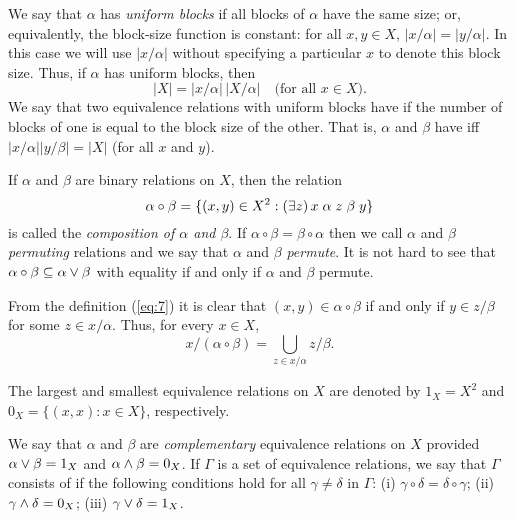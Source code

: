 We say that $\alpha$ has \emph{uniform blocks} if all blocks of  $\alpha$ have
the same size; or, equivalently, the block-size function is constant: for all 
$x, y \in X$, $|x/\alpha| = |y/\alpha|$.  
In this case we will use $|x/\alpha|$ without specifying
a particular $x$ to denote this block size.
Thus, if $\alpha$
has uniform blocks, then
\[
|X|= |x/\alpha| \,|X/\alpha| %
\quad \text{(for all $x\in X$).}
\]
We say that two equivalence relations with uniform
blocks  have 
 if the number of blocks of one is equal to
the block size of the other. That is,
$\alpha$ and $\beta$ 
have \cubs
iff $|x/\alpha||y/\beta| = |X|$ (for all $x$ and $y$).


If $\alpha$ and $\beta$ are binary relations on $X$, then the relation
\begin{equation}
  \label{eq:7}
\alpha \circ \beta = \{(x,y) \in X^2: (\exists z)\, x \mathrel{\alpha} z
\mathrel{\beta} y\}
\end{equation}
is called the \emph{composition of $\alpha$ and $\beta$}. If 
$\alpha \circ \beta = \beta \circ \alpha$ then we call $\alpha$ and $\beta$ 
\emph{permuting} relations and we say that $\alpha$ and $\beta$ \emph{permute}. 
It is not hard to see that $\alpha \circ \beta \subseteq \alpha \vee \beta$
with equality if and only if $\alpha$ and $\beta$ permute.

From the definition (\ref{eq:7}) it is clear that %
$(x,y) \in \alpha\circ \beta$ if and only if
$y \in z/\beta$ for some $z\in x/\alpha$.  Thus, for every $x\in X$,
  \begin{equation}
    \label{eq:1}
x/(\alpha\circ \beta) = \bigcup_{z \in x/\alpha} z/\beta.
  \end{equation}


The largest and smallest equivalence relations on $X$ are denoted by $1_X = X^2$
and $0_X = \{(x,x) : x \in X\}$, respectively.

We say that $\alpha$ and $\beta$ are \emph{complementary} equivalence relations
on $X$ provided $\alpha \vee \beta = 1_X$ and $\alpha \wedge \beta = 0_X$.
If $\Gamma$ is a set of equivalence relations, 
we say that $\Gamma$ consists of 
if the following conditions hold for all $\gamma \neq \delta$ in $\Gamma$:
(i) $\gamma \circ \delta = \delta \circ \gamma$;  
(ii) $\gamma \wedge \delta = 0_X$;  
(iii) $\gamma \vee \delta = 1_X$.


